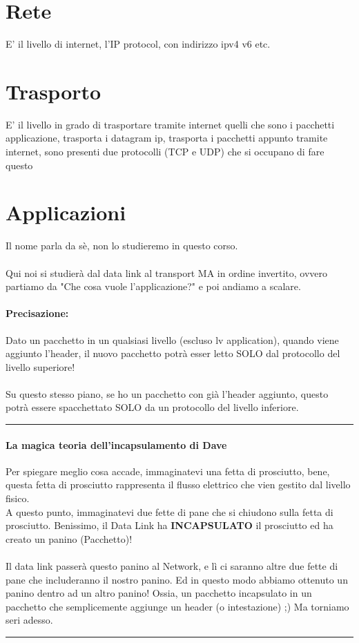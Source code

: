 \documentclass[12pt, a4paper, openany, twoside]{book}
\begin{document}
\section{Rete} E' il livello di internet, l'IP protocol, con indirizzo ipv4 v6 etc.
\section{Trasporto}
E' il livello in grado di trasportare tramite internet quelli che sono i pacchetti
applicazione, trasporta i datagram ip, trasporta i pacchetti appunto tramite 
internet, sono presenti due protocolli (TCP e UDP) che si occupano di fare questo
\section{Applicazioni} Il nome parla da sè, non lo studieremo in questo corso.
\\ \\
Qui noi si studierà dal data link al transport MA in ordine invertito, ovvero
partiamo da "Che cosa vuole l'applicazione?" e poi andiamo a scalare.
\paragraph{Precisazione:}
Dato un pacchetto in un qualsiasi livello (escluso lv application), 
quando viene aggiunto l'header, il nuovo pacchetto potrà esser letto SOLO dal
protocollo del livello superiore! \\ \\
Su questo stesso piano, se ho un pacchetto con già l'header aggiunto, questo
potrà essere spacchettato SOLO da un protocollo del livello inferiore.
\\
{\color{black} \rule{\linewidth}{0.2mm} }
\paragraph{La magica teoria dell'incapsulamento di Dave} 
Per spiegare meglio cosa accade, immaginatevi una fetta di prosciutto, bene, 
questa fetta di prosciutto rappresenta il \color{red}flusso elettrico\color{black} che vien gestito 
dal livello fisico. \\
A questo punto, immaginatevi due fette di pane che si chiudono sulla fetta di 
prosciutto. Benissimo, il Data Link ha \textbf{INCAPSULATO} il prosciutto ed ha
creato un panino (\color{red}Pacchetto\color{black})! \\ \\
Il data link passerà questo panino al \color{red}Network\color{black}, e lì ci 
saranno altre due fette di pane che includeranno il nostro panino. 
Ed in questo modo abbiamo ottenuto un panino dentro ad un altro panino! Ossia,
un pacchetto incapsulato in un pacchetto che semplicemente aggiunge un header 
(o intestazione) ;) Ma torniamo seri adesso. \\
{\color{black} \rule{\linewidth}{0.2mm} }
\\
\end{document}
